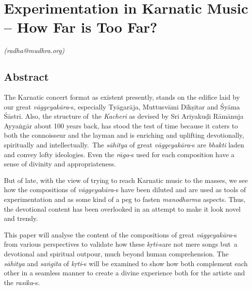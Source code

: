 
\chapter{Experimentation in Karnatic Music – How Far is Too Far?}\label{chapter4}


\vspace{-.3cm}

\begin{flushright}
\textit{(radha@mudhra.org)}
\end{flushright}


\section*{Abstract}

The Karnatic concert format as existent presently, stands on the edifice laid by our great \textit{vāggeyakāra}-s, especially Tyāgarāja, Muttusvāmi Dīkṣitar and Śyāma Śāstri. Also, the structure of the \textit{Kacheri} as devised by Sri Ariyakuḍi Rāmānuja Ayyaṅgār about 100 years back, has stood the test of time because it caters to both the connoisseur and the layman and is enriching and uplifting devotionally, spiritually and intellectually. The \textit{sāhitya} of great \textit{vāggeyakāra}-s are \textit{bhakti} laden and convey lofty ideologies. Even the \textit{rāga}-s used for each composition have a sense of divinity and appropriateness.

But of late, with the view of trying to reach Karnatic music to the masses, we see how the compositions of \textit{vāggeyakāra}-s have been diluted and are used as tools of experimentation and as some kind of a peg to fasten \textit{manodharma} aspects. Thus, the devotional content has been overlooked in an attempt to make it look novel and trendy.

This paper will analyse the content of the compositions of great \textit{vāggeyakāra}-s from various perspectives to validate how these \textit{kṛti}-s\break are not mere songs but a devotional and spiritual outpour, much beyond human comprehension. The \textit{sāhitya} and \textit{saṅgīta} of \textit{kṛti}-s will be examined to show how both complement each other in a seamless manner to create a divine experience both for the artiste and the \textit{rasika}-s.


